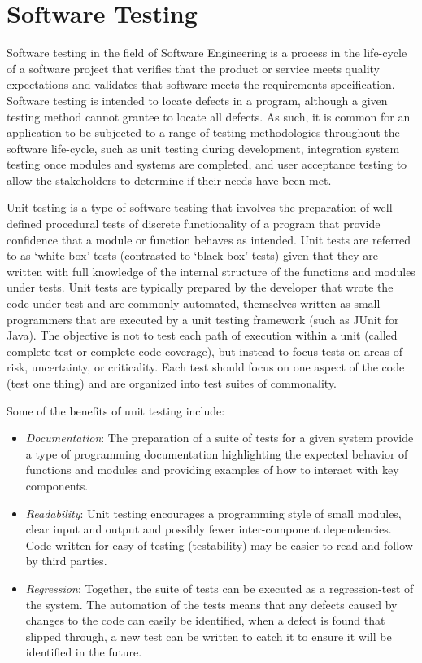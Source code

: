 \documentclass[a4paper, 11pt]{article}
\begin{document}
%
%
\section{Software Testing}
\label{sec:testing}
Software testing in the field of Software Engineering is a process in the life-cycle of a software project that verifies that the product or service meets quality expectations and validates that software meets the requirements specification. Software testing is intended to locate defects in a program, although a given testing method cannot grantee to locate all defects. As such, it is common for an application to be subjected to a range of testing methodologies throughout the software life-cycle, such as unit testing during development, integration system testing once modules and systems are completed, and user acceptance testing to allow the stakeholders to determine if their needs have been met.

Unit testing is a type of software testing that involves the preparation of well-defined procedural tests of discrete functionality of a program that provide confidence that a module or function behaves as intended. Unit tests are referred to as `white-box' tests (contrasted to `black-box' tests) given that they are written with full knowledge of the internal structure of the functions and modules under tests. Unit tests are typically prepared by the developer that wrote the code under test and are commonly automated, themselves written as small programmers that are executed by a unit testing framework (such as JUnit for Java). The objective is not to test each path of execution within a unit (called complete-test or complete-code coverage), but instead to focus tests on areas of risk, uncertainty, or criticality. Each test should focus on one aspect of the code (test one thing) and are organized into test suites of commonality. 

Some of the benefits of unit testing include:

\begin{itemize}
  \item \emph{Documentation}: The preparation of a suite of tests for a given system provide a type of programming documentation highlighting the expected behavior of functions and modules and providing examples of how to interact with key components.
  \item \emph{Readability}: Unit testing encourages a programming style of small modules, clear input and output and possibly fewer inter-component dependencies. Code written for easy of testing (testability) may be easier to read and follow by third parties.
  \item \emph{Regression}: Together, the suite of tests can be executed as a regression-test of the system. The automation of the tests means that any defects caused by changes to the code can easily be identified, when a defect is found that slipped through, a new test can be written to catch it to ensure it will be identified in the future.
\end{itemize}
\end{document}

